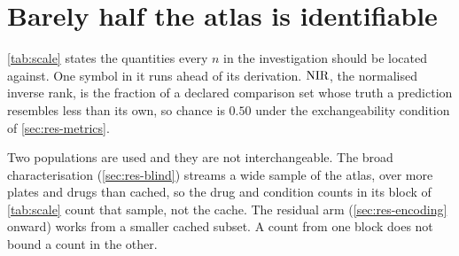 \section{Barely half the atlas is identifiable}

\cref{tab:scale} states the quantities every $n$ in the investigation should be
located against. One symbol in it runs ahead of its
derivation. $\textrm{NIR}$, the normalised inverse rank, is the
fraction of a declared comparison set whose truth a prediction resembles less
than its own, so chance is $0.50$ under the exchangeability condition of
\cref{sec:res-metrics}.

\begin{scopelimit}
Two populations are used and they are not interchangeable. The broad
characterisation (\cref{sec:res-blind}) streams a wide sample of the atlas, over
more plates and drugs than cached, so the drug and condition counts in its block
of \cref{tab:scale} count that sample, not the cache. The residual arm
(\cref{sec:res-encoding} onward) works from a smaller cached subset. A count
from one block does not bound a count in the other.
\end{scopelimit}

